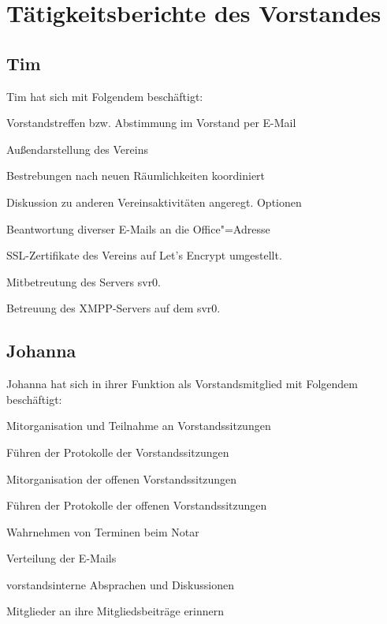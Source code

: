 \documentclass[ngerman]{scrartcl}
\begin{document}
\section{Tätigkeitsberichte des Vorstandes}

\subsection{Tim}

Tim hat sich mit Folgendem beschäftigt:

\begin{compactitem}
\item Vorstandstreffen bzw. Abstimmung im Vorstand per E-Mail
\item Außendarstellung des Vereins
\item Bestrebungen nach neuen Räumlichkeiten koordiniert 
\item Diskussion zu anderen Vereinsaktivitäten angeregt. Optionen
\item Beantwortung diverser E-Mails an die Office"=Adresse
\item SSL-Zertifikate des Vereins auf Let's Encrypt umgestellt.
\item Mitbetreutung des Servers svr0.
\item Betreuung des XMPP-Servers auf dem svr0.
\end{compactitem}

\subsection{Johanna}

Johanna hat sich in ihrer Funktion als Vorstandsmitglied mit Folgendem 
beschäftigt:

\begin{compactitem}
    \item Mitorganisation und Teilnahme an Vorstandssitzungen
    \item Führen der Protokolle der Vorstandssitzungen
    \item Mitorganisation der offenen Vorstandssitzungen
    \item Führen der Protokolle der offenen Vorstandssitzungen
    \item Wahrnehmen von Terminen beim Notar
    \item Verteilung der E-Mails
    \item vorstandsinterne Absprachen und Diskussionen 
    \item Mitglieder an ihre Mitgliedsbeiträge erinnern
\end{compactitem}
\end{document}
